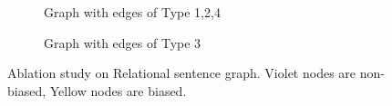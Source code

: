 \documentclass[letterpaper]{article} %
\begin{document}
\begin{figure}[!htbp]
\begin{subfigure}[t]{.15\linewidth}
    \caption{\scriptsize Graph with edges of Type 1,2,4}
    \label{subfig:ab124}
  \end{subfigure}
  \begin{subfigure}[t]{.15\linewidth}
    \caption{\scriptsize Graph with edges of Type 3}
    \label{subfig:ab3}
  \end{subfigure}
    \caption{Ablation study on Relational sentence graph. {Violet nodes} are non-biased, {Yellow nodes} are biased.}
    \label{fig:ablation}
  \end{figure}
  
\end{document}
